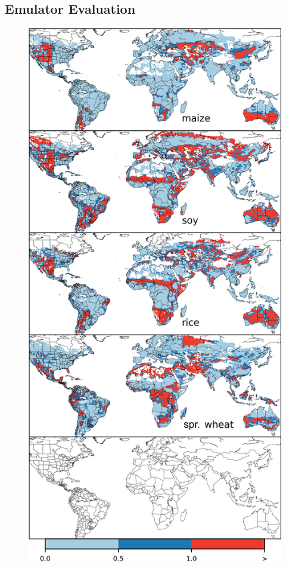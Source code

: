 \documentclass[10pt]{article}
\begin{document}
\clearpage
\subsection{Emulator Evaluation}
\begin{figure}[h!]
\centering
\begin{minipage}{.45\textwidth}
\centering
\includegraphics[width=\textwidth]{s_em_err_JULES.png}\\

\end{minipage}
\end{figure}
\end{document}
